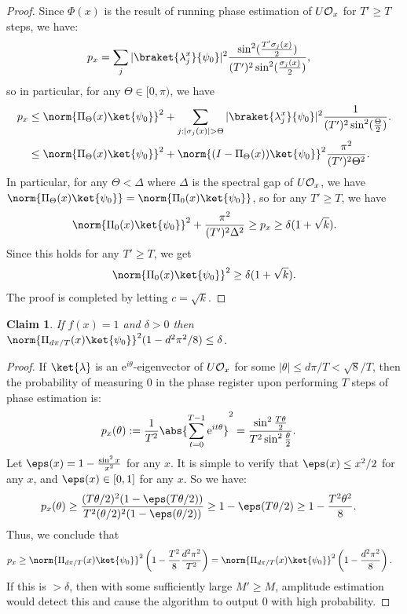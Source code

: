 \documentclass[11pt]{article}
\numberwithin{equation}{section}
\newtheorem{claim}[theorem]{Claim}
\theoremstyle{definition}
\theoremstyle{plain}
\newcommand{\eee}{\mathrm e}
\begin{document}
\begin{proof}
Since $\Phi(x)$ is the result of running phase estimation of $U{\cal O}_x$ for $T'\geq T$ steps, we have:
\begin{align*}
p_x &= \sum_j|\braket{\lambda_j^x}{\psi_0}|^2\frac{\sin^2(\frac{T'\sigma_j(x)}{2})}{(T')^2\sin^2(\frac{\sigma_j(x)}{2})},
\end{align*}
so in particular, for any $\Theta\in [0,\pi)$, we have
\begin{align*}
p_x &\leq \norm{\Pi_{\Theta}(x)\ket{\psi_0}}^2+\sum_{j:|\sigma_j(x)|>\Theta}|\braket{\lambda_j^x}{\psi_0}|^2\frac{1}{(T')^2\sin^2(\frac{\Theta}{2})}.\\
&\leq \norm{\Pi_\Theta(x)\ket{\psi_0}}^2 + \norm{(I-\Pi_\Theta(x))\ket{\psi_0}}^2\frac{\pi^2}{(T')^2\Theta^2}.
\end{align*}
In particular, for any $\Theta<\Delta$ where $\Delta$ is the spectral gap of $U{\cal O}_x$, we have $\norm{\Pi_\Theta(x)\ket{\psi_0}}=\norm{\Pi_0(x)\ket{\psi_0}}$, so for any $T'\geq T$, we have
$$\norm{\Pi_0(x)\ket{\psi_0}}^2+\frac{\pi^2}{(T')^2\Delta^2}\geq p_x\geq  \delta(1+\sqrt{k}).$$
Since this holds for any $T'\geq T$, we get
$$\norm{\Pi_0(x)\ket{\psi_0}}^2 \geq \delta(1+\sqrt{k}).$$
The proof is completed by letting $c=\sqrt{k}$.
\end{proof}

\begin{claim}
If $f(x)=1$ and $\delta>0$ then $\norm{\Pi_{d\pi/T}(x)\ket{\psi_0}}^2(1-d^2\pi^2/8)\leq \delta$.
\end{claim}
\begin{proof}
If $\ket{\lambda}$ is an $\eee^{i\theta}$-eigenvector of $U{\cal O}_x$ for some $|\theta|\leq d\pi/T < \sqrt{8}/T$, then the probability of measuring 0 in the phase register upon performing $T$ steps of phase estimation is:
\begin{align*}
p_x(\theta):=\frac{1}{T^2}\abs{\sum_{t=0}^{T-1}\eee^{it\theta}}^2 &= \frac{\sin^2\frac{T\theta}{2}}{T^2\sin^2\frac{\theta}{2}}.
\end{align*}
Let $\eps(x)=1-\frac{\sin^2x}{x^2}$ for any $x$. It is simple to verify that $\eps(x)\leq x^2/2$ for any $x$, and $\eps(x)\in [0,1]$ for any $x$. So we have:
\begin{align*}
p_x(\theta) &\geq \frac{(T\theta/2)^2(1-\eps(T\theta/2))}{T^2(\theta/2)^2(1-\eps(\theta/2))}
\geq 1-\eps(T\theta/2)
\geq 1-\frac{T^2\theta^2}{8}.
\end{align*}
Thus, we conclude that 
\begin{align*}
p_x &\geq \norm{\Pi_{d\pi/T}(x)\ket{\psi_0}}^2\left(1-\frac{T^2}{8}\frac{d^2\pi^2}{T^2}\right)
=\norm{\Pi_{d\pi/T}(x)\ket{\psi_0}}^2\left(1-\frac{d^2\pi^2}{8}\right).
\end{align*}
If this is $>\delta$, then with some sufficiently large $M'\geq M$, amplitude estimation would detect this and cause the algorithm to output 0 with high probability. 
\end{proof}
\end{document}
